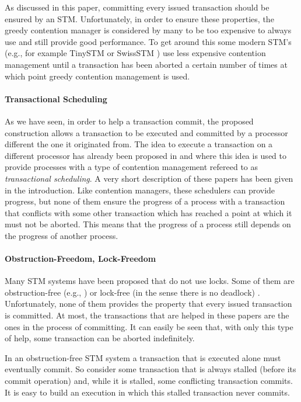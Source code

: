 As discussed  in this paper,  committing every issued transaction  should be
ensured by an STM. 
Unfortunately,  in order to  ensure these  properties, the  greedy contention
manager is considered  by many to be too expensive to  always use and still
provide good performance. 
To  get around  this  some modern  STM's (e.g., for example  
TinySTM  \cite{FFR08}   or  SwissSTM   \cite{DGK09})  use   less  expensive
contention  management  until  a transaction  has been   aborted a  certain
number  of times  at  which point greedy contention management is used. 

\paragraph{Transactional Scheduling}  
As we have seen, in order to help a transaction commit,  
the proposed construction allows a transaction to be executed and committed
by a processor different  the one it originated from. 
The idea  to execute  a transaction on   a different processor  has already
been proposed  in \cite{ALKJKW09} and  \cite{AM09} where this idea is used
to   provide processes with  a   type  of
contention management refereed to as {\it transactional scheduling}. 
A very short description of these papers has been given in  the introduction.
Like  contention  managers, these  schedulers  can  provide
progress,  but  none of  them  ensure  the progress  of  a  process with  a
transaction that conflicts with some  other transaction which has reached a
point at which it  must not be aborted. This means that  the  progress of a
process still  depends on the progress  of another process. 


\paragraph{Obstruction-Freedom, Lock-Freedom} 
Many STM systems have been proposed that do not use locks.
Some of them  are obstruction-free  (e.g., \cite{HLMS03,ST97})
or lock-free  (in the sense there is no deadlock) \cite{GHS08}.
Unfortunately, none of them  provides the property that every issued 
transaction is committed. At most, the transactions that are helped 
in these papers are the ones in the process of committing.
It can easily be seen that, with only this type of help,  some transaction 
can be aborted indefinitely.

In an obstruction-free STM system a transaction that is executed alone 
must eventually commit. So consider some transaction that is always 
stalled (before its commit operation) and, while it is stalled, 
some conflicting transaction commits. It is easy to build an execution 
in which this stalled transaction never commits.

